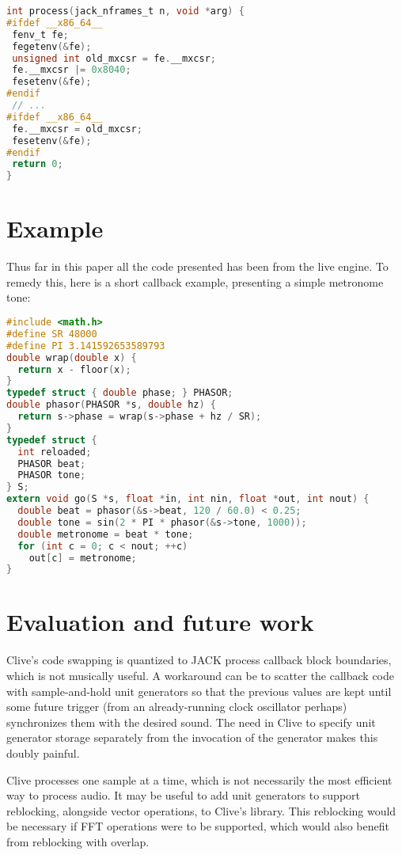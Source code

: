 \documentclass[11pt,a4paper]{article}
\begin{document}
\begin{lstlisting}[language=C, caption={Setting DAZ and FTZ}, label=ldenormal]
int process(jack_nframes_t n, void *arg) {
#ifdef __x86_64__
 fenv_t fe;
 fegetenv(&fe);
 unsigned int old_mxcsr = fe.__mxcsr;
 fe.__mxcsr |= 0x8040;
 fesetenv(&fe);
#endif
 // ...
#ifdef __x86_64__
 fe.__mxcsr = old_mxcsr;
 fesetenv(&fe);
#endif
 return 0;
}
\end{lstlisting}

\section{Example}\label{example}

Thus far in this paper all the code presented has been from the live
engine. To remedy this, here is a short callback example, presenting
a simple metronome tone:

\begin{lstlisting}[language=C, caption={Metronome example}, label=lexample]
#include <math.h>
#define SR 48000
#define PI 3.141592653589793
double wrap(double x) {
  return x - floor(x);
}
typedef struct { double phase; } PHASOR;
double phasor(PHASOR *s, double hz) {
  return s->phase = wrap(s->phase + hz / SR);
}
typedef struct {
  int reloaded;
  PHASOR beat;
  PHASOR tone;
} S;
extern void go(S *s, float *in, int nin, float *out, int nout) {
  double beat = phasor(&s->beat, 120 / 60.0) < 0.25;
  double tone = sin(2 * PI * phasor(&s->tone, 1000));
  double metronome = beat * tone;
  for (int c = 0; c < nout; ++c)
    out[c] = metronome;
}
\end{lstlisting}

\section{Evaluation and future work}\label{evaluation}

Clive's code swapping is quantized to JACK process callback block boundaries,
which is not musically useful.  A workaround can be to scatter the callback
code with sample-and-hold unit generators so that the previous values are kept
until some future trigger (from an already-running clock oscillator perhaps)
synchronizes them with the desired sound.  The need in Clive to specify unit
generator storage separately from the invocation of the generator makes this
doubly painful.

Clive processes one sample at a time, which is not necessarily the most
efficient way to process audio.  It may be useful to add unit generators to
support reblocking, alongside vector operations, to Clive's library.  This
reblocking would be necessary if FFT operations were to be supported,
which would also benefit from reblocking with overlap.
\end{document}
